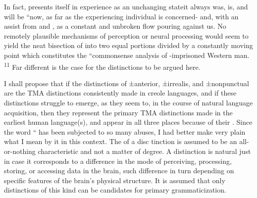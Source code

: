In fact,  presents itself in experience as an unchanging state\-it always was, is, and will be ``now, as far as the experiencing indi\-vidual is concerned- and, with an assist from  and , as a constant and unbroken flow pouring against us. No remotely plausible mechanisms of perception or neural processing would seem to yield the neat bisection of  into two equal portions divided by a
constantly moving point which constitutes the ``commonsense analysis of -imprisoned Western man. \textsuperscript{11} Far different is the case for the distinctions to be argued here.

I shall propose that if the distinctions of ±anterior, ±irrealis, and
±nonpunctual are the TMA distinctions consistently made in creole languages, and if these distinctions struggle to emerge, as they seem to, in the course of natural language acquisition, then they represent the primary TMA distinctions made in the earliest human language(s), and appear in all three places because of their . Since the word `` has been subjected to so many abuses, I had better make very plain what I mean by it in this context. The  of a disc tinction is assumed to be an all-or-nothing characteristic and not a matter of degree. A distinction is natural just in case it corresponds to a difference in the mode of perceiving, processing, storing, or access\-ing data in the brain, such difference in turn depending on specific features of the brain's physical structure. It is assumed that only dis\-tinctions of this kind can be candidates for primary grammaticization.

